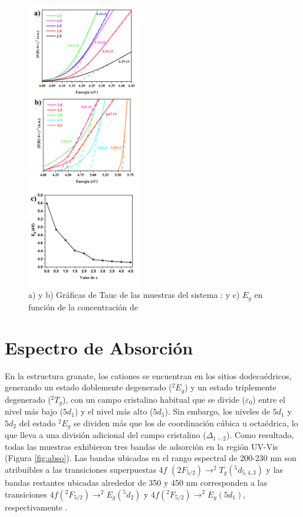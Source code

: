 \begin{figure}[H]
    \centering%

    \includegraphics[width=0.45\textwidth]{Kap4/Tauc2.png}%
    \caption{a) y b) Gráficas de Tauc de las muestras del sistema
    : y c) $E_g$ en función de la
    concentración de }\label{fig:tauc}
\end{figure}

\section{Espectro de Absorción}

En la estructura granate, los cationes  se encuentran en los sitios
dodecaédricos, generando un estado doblemente degenerado ($^{2}E_{g}$) y un
estado
triplemente degenerado ($^{2}T_{g}$), con un campo cristalino habitual que se
divide
($\varepsilon_{0}$) entre el nivel más bajo ($5d_{1}$) y el nivel más alto
($5d_5$). Sin embargo, los
niveles de $5d_1$ y $5d_2$ del estado $^2E_g$ se dividen más que los de
coordinación
cúbica u octaédrica, lo que lleva a una división adicional del campo cristalino
\cite{Dorenbos2003}
($\Delta_{1-2}$). Como resultado, todas las muestras exhibieron tres bandas de
adsorción en la región UV-Vis (Figura \ref{fig:abso}). Las bandas ubicadas en
el rango
espectral de 200-230 nm son atribuibles a las transiciones superpuestas $4f$
$(2F_{5/2}) \rightarrow ^2T_g(^5d_{5,4,3})$ y las bandas restantes ubicadas
alrededor de 350 y 450
nm corresponden a las transiciones $4f(^2F_{5/2}) \rightarrow ^2E_g (^5d_2)$ y
    $4f(^2F_{5/2}) \rightarrow ^2E_g
    (5d_1)$, respectivamente \cite{Ueda2019}.\\

